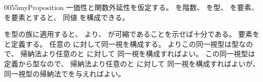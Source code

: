 \documentclass[index]{subfiles}
\begin{document}
\begin{myBlock}{0055}{myProposition}
  一価性と関数外延性を仮定する。
  を階数、
  を型、
  を要素、
  を要素とすると、
  同値
  を構成できる。
\end{myBlock}
\begin{myProof}
  を型の族に適用すると、
  より、
  が可縮であることを示せば十分である。
  要素を
  と定義する。
  任意の
  に対して同一視を構成する。
  よりこの同一視型は型なので、
  帰納法より任意のと
  に対して
  同一視を構成すればよい。
  この同一視型は定義から型なので、
  帰納法より任意のと
  に対して
  同一視を構成すればよいが、
  同一視型の帰納法でを与えればよい。
\end{myProof}
\end{document}
